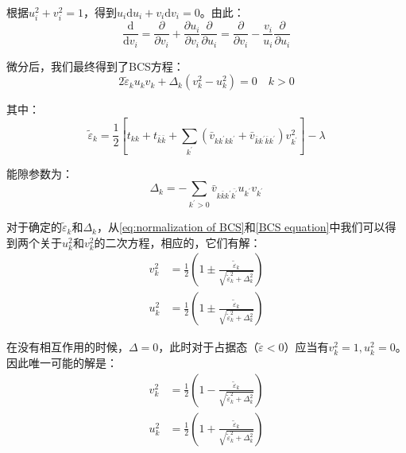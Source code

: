 \begin{booknote*}
根据$u^{2}_{i}+v^{2}_{i}=1$，得到$u_{i}\mathrm{d}u_{i}+v_{i}\mathrm{d}v_{i}=0$。由此：
\[
\frac{\mathrm{d}}{\mathrm{d}v_{i}}=\frac{\partial}{\partial v_{i}}+\frac{\partial u_{i}}{\partial v_{i}}\frac{\partial}{\partial u_{i}}=\frac{\partial}{\partial v_{i}}-\frac{v_{i}}{u_{i}}\frac{\partial}{\partial u_{i}}
\]
\end{booknote*}
微分后，我们最终得到了BCS方程：
\begin{equation}
2\tilde{\varepsilon}_{k}u_{k}v_{k}+\Delta_{k}(v^{2}_{k}-u^{2}_{k})=0\quad k>0\label{BCS equation}
\end{equation}

其中：
\begin{equation}
\tilde{\varepsilon}_{k}=\frac{1}{2}\left[t_{kk}+t_{\bar{k}\bar{k}}+\sum_{k^{\prime}}(\bar{v}_{kk^{\prime}kk^{\prime}}+\bar{v}_{\bar{k}k^{\prime}\bar{k}k^{\prime}})v^{2}_{k^{\prime}}\right]-\lambda\label{eq:tilde epsilon}
\end{equation}

能隙参数为：
\begin{equation}
\Delta_{k}=-\sum_{k^{\prime}>0}\bar{v}_{k\bar{k}k^{\prime}\bar{k^{\prime}}}u_{k^{\prime}}v_{k^{\prime}}\label{eq:Delta}
\end{equation}

对于确定的$\tilde{\varepsilon}_{k}$和$\Delta_{k}$，从\ref{eq:normalization of BCS}和\ref{BCS equation}中我们可以得到两个关于$u^{2}_{k}$和$v^{2}_{k}$的二次方程，相应的，它们有解：
\begin{align*}
v^{2}_{k} & =\frac{1}{2}\left(1\pm\frac{\tilde{\varepsilon}_{k}}{\sqrt{\tilde{\varepsilon}^{2}_{k}+\Delta^{2}_{k}}}\right)\\
u^{2}_{k} & =\frac{1}{2}\left(1\pm\frac{\tilde{\varepsilon}_{k}}{\sqrt{\tilde{\varepsilon}^{2}_{k}+\Delta^{2}_{k}}}\right)
\end{align*}

在没有相互作用的时候，$\Delta=0$，此时对于占据态（$\tilde{\varepsilon}<0$）应当有$v^{2}_{k}=1,u^{2}_{k}=0$。因此唯一可能的解是：
\begin{align}
v^{2}_{k} & =\frac{1}{2}\left(1-\frac{\tilde{\varepsilon}_{k}}{\sqrt{\tilde{\varepsilon}^{2}_{k}+\Delta^{2}_{k}}}\right)\label{eq:formal solution of BCS eq}\\
u^{2}_{k} & =\frac{1}{2}\left(1+\frac{\tilde{\varepsilon}_{k}}{\sqrt{\tilde{\varepsilon}^{2}_{k}+\Delta^{2}_{k}}}\right)\nonumber 
\end{align}
 

